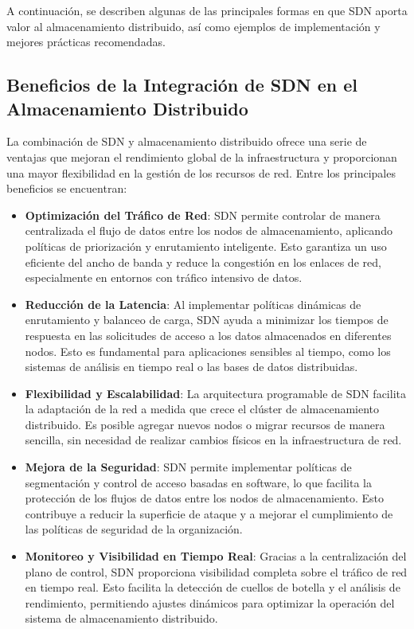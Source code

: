 {        A continuación, se describen algunas de las principales formas en que SDN aporta valor al almacenamiento distribuido, así como ejemplos de implementación y mejores prácticas recomendadas.
        
        \subsection{Beneficios de la Integración de SDN en el Almacenamiento Distribuido}
            La combinación de SDN y almacenamiento distribuido ofrece una serie de ventajas que mejoran el rendimiento global de la infraestructura y proporcionan una mayor flexibilidad en la gestión de los recursos de red. Entre los principales beneficios se encuentran:
            
            \begin{itemize}
                \item \textbf{Optimización del Tráfico de Red}: SDN permite controlar de manera centralizada el flujo de datos entre los nodos de almacenamiento, aplicando políticas de priorización y enrutamiento inteligente. Esto garantiza un uso eficiente del ancho de banda y reduce la congestión en los enlaces de red, especialmente en entornos con tráfico intensivo de datos.
                \item \textbf{Reducción de la Latencia}: Al implementar políticas dinámicas de enrutamiento y balanceo de carga, SDN ayuda a minimizar los tiempos de respuesta en las solicitudes de acceso a los datos almacenados en diferentes nodos. Esto es fundamental para aplicaciones sensibles al tiempo, como los sistemas de análisis en tiempo real o las bases de datos distribuidas.
                \item \textbf{Flexibilidad y Escalabilidad}: La arquitectura programable de SDN facilita la adaptación de la red a medida que crece el clúster de almacenamiento distribuido. Es posible agregar nuevos nodos o migrar recursos de manera sencilla, sin necesidad de realizar cambios físicos en la infraestructura de red.
                \item \textbf{Mejora de la Seguridad}: SDN permite implementar políticas de segmentación y control de acceso basadas en software, lo que facilita la protección de los flujos de datos entre los nodos de almacenamiento. Esto contribuye a reducir la superficie de ataque y a mejorar el cumplimiento de las políticas de seguridad de la organización.
                \item \textbf{Monitoreo y Visibilidad en Tiempo Real}: Gracias a la centralización del plano de control, SDN proporciona visibilidad completa sobre el tráfico de red en tiempo real. Esto facilita la detección de cuellos de botella y el análisis de rendimiento, permitiendo ajustes dinámicos para optimizar la operación del sistema de almacenamiento distribuido.
            \end{itemize}
            
}

